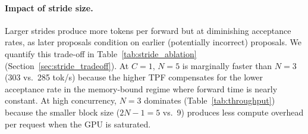 \paragraph{Impact of stride size.}
Larger strides produce more tokens per forward but at diminishing acceptance rates, as later proposals condition on earlier (potentially incorrect) proposals. We quantify this trade-off in Table~\ref{tab:stride_ablation} (Section~\ref{sec:stride_tradeoff}). At $C{=}1$, $N{=}5$ is marginally faster than $N{=}3$ (303 vs.\ 285 tok/s) because the higher TPF compensates for the lower acceptance rate in the memory-bound regime where forward time is nearly constant. At high concurrency, $N{=}3$ dominates (Table~\ref{tab:throughput}) because the smaller block size ($2N{-}1 = 5$ vs.\ 9) produces less compute overhead per request when the GPU is saturated.
